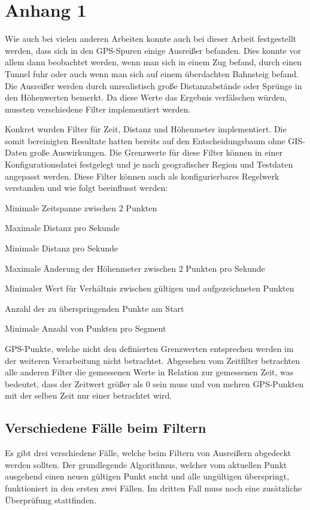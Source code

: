 \chapter*{Anhang 1}

Wie auch bei vielen anderen Arbeiten konnte auch bei dieser Arbeit festgestellt werden, dass sich in den GPS-Spuren einige Ausreißer befanden. Dies konnte vor allem dann beobachtet werden, wenn man sich in einem Zug befand, durch einen Tunnel fuhr oder auch wenn man sich auf einem überdachten Bahnsteig befand. Die Ausreißer werden durch unrealistisch große Distanzabstände oder Sprünge in den Höhenwerten bemerkt. Da diese Werte das Ergebnis verfälschen würden, mussten verschiedene Filter implementiert werden. 

Konkret wurden Filter für Zeit, Distanz und Höhenmeter implementiert. Die somit bereinigten Resultate hatten bereits auf den Entscheidungsbaum ohne GIS-Daten große Auswirkungen. Die Grenzwerte für diese Filter können in einer Konfigurationsdatei festgelegt und je nach geografischer Region und Testdaten angepasst werden. Diese Filter können auch als konfigurierbares Regelwerk verstanden und wie folgt beeinflusst werden:


\begin{pitemize}
\item Minimale Zeitspanne zwischen 2 Punkten
\item Maximale Distanz pro Sekunde
\item Minimale Distanz pro Sekunde
\item Maximale Änderung der Höhenmeter zwischen 2 Punkten pro Sekunde
\item Minimaler Wert für Verhältnis zwischen gültigen und aufgezeichneten Punkten
\item Anzahl der zu überspringenden Punkte am Start
\item Minimale Anzahl von Punkten pro Segment
\end{pitemize}

GPS-Punkte, welche nicht den definierten Grenzwerten entsprechen werden im der weiteren Verarbeitung nicht betrachtet. Abgesehen vom Zeitfilter betrachten alle anderen Filter die gemessenen Werte in Relation zur gemessenen Zeit, was bedeutet, dass der Zeitwert größer als 0 sein muss und von mehren GPS-Punkten mit der selben Zeit nur einer betrachtet wird.

\section*{Verschiedene Fälle beim Filtern}
Es gibt drei verschiedene Fälle, welche beim Filtern von Ausreißern abgedeckt werden sollten. Der grundlegende Algorithmus, welcher vom aktuellen Punkt ausgehend einen neuen gültigen Punkt sucht und alle ungültigen überspringt, funktioniert in den ersten zwei Fällen. Im dritten Fall muss noch eine zusätzliche Überprüfung stattfinden.


